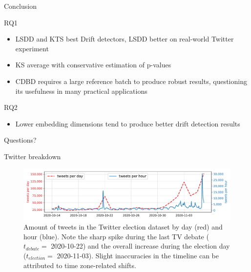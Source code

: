 \documentclass{beamer} %
\begin{document}
	\begin{frame}{Conclusion}
		\begin{alertblock}{RQ1}
			\begin{itemize}
				\item LSDD and KTS best Drift detectors, LSDD better on real-world Twitter experiment
				\item KS average with conservative  estimation  of  p-values
				\item CDBD requires a large reference batch to produce robust results, questioning its usefulness in many practical applications
			\end{itemize}
		\end{alertblock}
		
		\begin{alertblock}{RQ2}
			\begin{itemize}
				\item Lower embedding dimensions tend to produce better drift detection results
			\end{itemize}
		\end{alertblock}
	\end{frame}


	\begin{frame}[standout]
		Questions?
	\end{frame}

	\appendix
	
	\begin{frame}{Twitter breakdown}
		\begin{figure}[htb!] %
			\centering
			\includegraphics[width=.98\linewidth]{Bilder/tweet_counts.pdf}
			\caption{Amount of tweets in the Twitter election dataset by day (red) and hour (blue).
				Note the sharp spike during the last TV debate ($t_{\mathit{debate}} = $ 2020-10-22) and the overall increase during the election day ($t_{\mathit{election}} = $ 2020-11-03).
				Slight inaccuracies in the timeline can be attributed to time zone-related shifts.}
			\label{Fig:tweet_counts}
		\end{figure}
	\end{frame}
	
	
	
\end{document}

